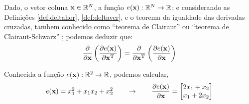 \begin{comment}
Assim, 
$\frac{\partial e(\VECTOR{x}) }{\partial \VECTOR{x}} \in \mathbb{R}^{N \times 1}$,
$\frac{\partial \VECTOR{f}(\VECTOR{x}) }{\partial \VECTOR{x}} \in \mathbb{R}^{(MN) \times 1}$ e
$\frac{\partial \VECTOR{g}(\VECTOR{x}) }{\partial \VECTOR{x}} \in \mathbb{R}^{(MN) \times L}$.
\end{comment}


\begin{corollary}\label{cor:derder}
Dado,
o vetor coluna $\VECTOR{x}\in \mathbb{R}^N$, 
a função $e(\VECTOR{x}): \mathbb{R}^N \rightarrow \mathbb{R}$; e
considerando as Definições \ref{def:deltahor}, \ref {def:deltaver}, e o 
teorema da igualdade das derivadas cruzadas, 
tambem conhecido como ``teorema de Clairaut'' \cite[pp. 885]{stewart2008calculus}
ou ``teorema de Clairaut-Schwarz'' \cite[pp. 311]{telles2015matematica}; 
podemos deduzir que:
\begin{equation}
 \frac{\partial }{\partial \VECTOR{x}} \left( \frac{\partial e(\VECTOR{x} )}{\partial \VECTOR{x}^{\transpose}} \right) = 
\frac{\partial }{\partial \VECTOR{x}^{\transpose}} \left( \frac{\partial e(\VECTOR{x} )}{\partial \VECTOR{x}} \right)
\end{equation}
\end{corollary}


\begin{example}
Conhecida a função $e(\VECTOR{x}): \mathbb{R}^2 \rightarrow \mathbb{R}$, podemos calcular,
\begin{equation}
e(\VECTOR{x})=x_1^2+x_1 x_2+x_2^2
\qquad \rightarrow \qquad
\frac{\partial e(\VECTOR{x}) }{\partial \VECTOR{x}}=
\begin{bmatrix}
 2 x_1 + x_2 \\
 x_1 + 2 x_2
\end{bmatrix}
\end{equation}
\end{example}



